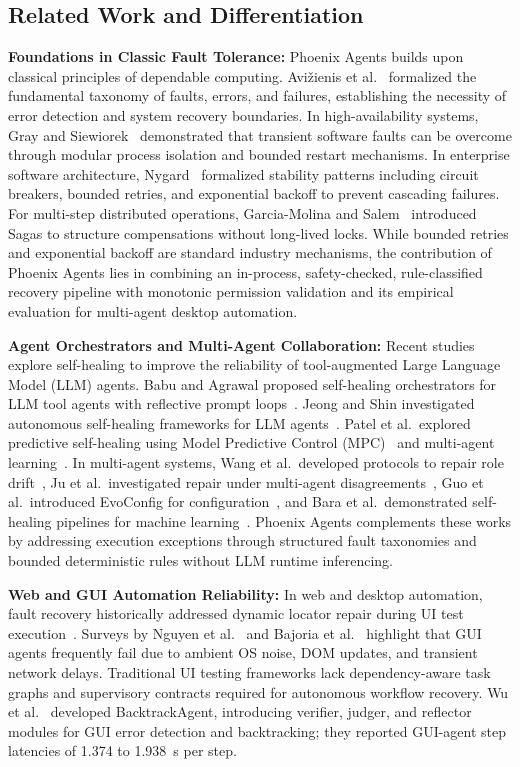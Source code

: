 \documentclass[conference]{IEEEtran}
\newcommand{\chg}[1]{{\color{blue}#1}}
\begin{document}
\subsection{Related Work and Differentiation}
\chg{\textbf{Foundations in Classic Fault Tolerance:} Phoenix Agents builds upon classical principles of dependable computing. Avi\v{z}ienis et al.~\cite{avizienis2004} formalized the fundamental taxonomy of faults, errors, and failures, establishing the necessity of error detection and system recovery boundaries. In high-availability systems, Gray and Siewiorek~\cite{gray1991} demonstrated that transient software faults can be overcome through modular process isolation and bounded restart mechanisms. In enterprise software architecture, Nygard~\cite{nygard2018} formalized stability patterns including circuit breakers, bounded retries, and exponential backoff to prevent cascading failures. For multi-step distributed operations, Garcia-Molina and Salem~\cite{garciamolina1987} introduced Sagas to structure compensations without long-lived locks. While bounded retries and exponential backoff are standard industry mechanisms, the contribution of Phoenix Agents lies in combining an in-process, safety-checked, rule-classified recovery pipeline with monotonic permission validation and its empirical evaluation for multi-agent desktop automation.}

\textbf{Agent Orchestrators and Multi-Agent Collaboration:} Recent studies explore self-healing to improve the reliability of tool-augmented Large Language Model (LLM) agents. Babu and Agrawal proposed self-healing orchestrators for LLM tool agents with reflective prompt loops~\cite{babu2026}. Jeong and Shin investigated autonomous self-healing frameworks for LLM agents~\cite{jeong2026}. Patel et al.\ explored predictive self-healing using Model Predictive Control (MPC)~\cite{patel2026a} and multi-agent learning~\cite{patel2026b}. In multi-agent systems, Wang et al.\ developed protocols to repair role drift~\cite{wang2026}, Ju et al.\ investigated repair under multi-agent disagreements~\cite{ju2025}, Guo et al.\ introduced EvoConfig for configuration~\cite{guo2026}, and Bara et al.\ demonstrated self-healing pipelines for machine learning~\cite{bara2026}. Phoenix Agents complements these works by addressing execution exceptions through structured fault taxonomies and bounded deterministic rules without LLM runtime inferencing.

\textbf{Web and GUI Automation Reliability:} In web and desktop automation, fault recovery historically addressed dynamic locator repair during UI test execution~\cite{garcia2026}. Surveys by Nguyen et al.~\cite{nguyen2025} and Bajoria et al.~\cite{bajoria2026} highlight that GUI agents frequently fail due to ambient OS noise, DOM updates, and transient network delays. Traditional UI testing frameworks lack dependency-aware task graphs and supervisory contracts required for autonomous workflow recovery. \chg{Wu et al.~\cite{wu2025} developed BacktrackAgent, introducing verifier, judger, and reflector modules for GUI error detection and backtracking; they reported GUI-agent step latencies of 1.374 to 1.938~s per step.}
\end{document}
